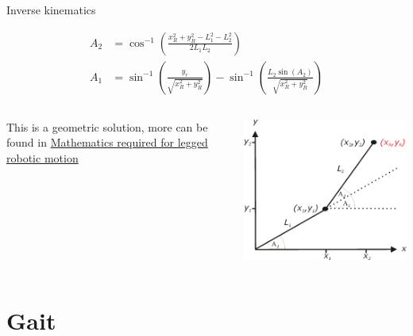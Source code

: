 \documentclass[compress]{beamer}
\begin{document}
\begin{frame}{Inverse kinematics}

    \begin{align*}
        A_2 &= \cos^{-1} \left( \frac{x_R^2+y_R^2-L_1^2-L_2^2}{2L_1L_2} \right) \\
        A_1 &= \sin^{-1} \left( \frac{y_r}{\sqrt{x_R^2+y_R^2}} \right)-\sin^{-1}\left( \frac{L_2 \sin(A_2)}{\sqrt{x_R^2+y_R^2}} \right)
    \end{align*}

    \begin{columns}
        \begin{column}{0.5\linewidth}

        This is a geometric solution, more can be found in
            \href{http://www.tribotix.info/Articles\&Tutorials/MathsforRobotics/Mathematics\%20required\%20for\%20Robotic\%20Motion.pdf}{Mathematics
            required for legged robotic motion}

        \end{column}
        \begin{column}{0.5\linewidth}
            \begin{center}
                \includegraphics[width=0.7\linewidth]{image32}
            \end{center}
        \end{column}
    \end{columns}

\end{frame}

\section{Gait}
\end{document}
